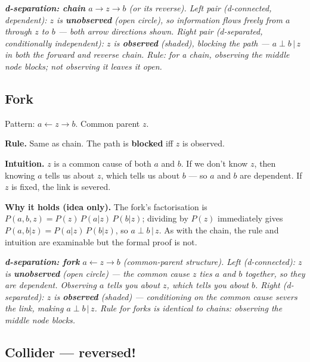 \documentclass[11pt, a4paper]{article}
\begin{document}
\begin{center}

\footnotesize\textit{\textbf{d-separation: chain} $a \to z \to b$ (or its reverse). \emph{Left pair} (d-connected, dependent): $z$ is \textbf{unobserved} (open circle), so information flows freely from $a$ through $z$ to $b$ --- both arrow directions shown. \emph{Right pair} (d-separated, conditionally independent): $z$ is \textbf{observed} (shaded), blocking the path --- $a \perp b \,|\, z$ in both the forward and reverse chain. Rule: for a chain, observing the middle node blocks; \emph{not} observing it leaves it open.}
\end{center}

\subsection{Fork}

Pattern: $a \leftarrow z \to b$. Common parent $z$.

\textbf{Rule.} Same as chain. The path is \textbf{blocked} iff $z$ is observed.

\textbf{Intuition.} $z$ is a common cause of both $a$ and $b$. If we don't know $z$, then knowing $a$ tells us about $z$, which tells us about $b$ — so $a$ and $b$ are dependent. If $z$ is fixed, the link is severed.

\textbf{Why it holds (idea only).} The fork's factorisation is $P(a,b,z) = P(z)\,P(a|z)\,P(b|z)$; dividing by $P(z)$ immediately gives $P(a,b|z) = P(a|z)\,P(b|z)$, so $a \perp b\,|\,z$. As with the chain, the rule and intuition are examinable but the formal proof is not.

\begin{center}

\footnotesize\textit{\textbf{d-separation: fork} $a \leftarrow z \to b$ (common-parent structure). \emph{Left} (d-connected): $z$ is \textbf{unobserved} (open circle) --- the common cause $z$ ties $a$ and $b$ together, so they are dependent. Observing $a$ tells you about $z$, which tells you about $b$. \emph{Right} (d-separated): $z$ is \textbf{observed} (shaded) --- conditioning on the common cause severs the link, making $a \perp b \,|\, z$. Rule for forks is identical to chains: observing the middle node blocks.}
\end{center}

\subsection{Collider --- reversed!}
\end{document}
